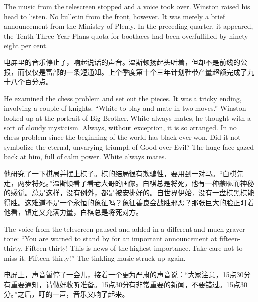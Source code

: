 \begin{paracol}{2}
\switchcolumn*

The music from the telescreen stopped and a voice took over. Winston
raised his head to listen. No bulletin from the front, however. It was
merely a brief announcement from the Ministry of Plenty. In the
preceding quarter, it appeared, the Tenth Three-Year
Plan\textquotesingle s quota for bootlaces had been overfulfilled by
ninety-eight per cent.

\switchcolumn

电屏里的音乐停止了，响起说话的声音。温斯顿扬起头听着，但却不是前线的公报，而仅仅是富部的一条短通知。上个季度第十个三年计划鞋带产量超额完成了九十八个百分点。

\switchcolumn*

He examined the chess problem and set out the pieces. It was a tricky
ending, involving a couple of knights. ``White to play and mate in two
moves.'' Winston looked up at the portrait of Big Brother. White always
mates, he thought with a sort of cloudy mysticism. Always, without
exception, it is so arranged. In no chess problem since the beginning of
the world has black ever won. Did it not symbolize the eternal,
unvarying triumph of Good over Evil? The huge face gazed back at him,
full of calm power. White always mates.

\switchcolumn

他研究了一下棋局并摆上棋子。棋的结局很有欺骗性，要用到一对马。``白棋先走，两步将死。''温斯顿看了看老大哥的画像。白棋总是将死，他有一种蒙眬而神秘的感觉。总是这样，没有例外，都是被安排好的。自世界伊始，没有一盘棋黑棋能得胜。这难道不是一个永恒的象征吗？象征善良会战胜邪恶？那张巨大的脸正盯着他看，镇定又充满力量，白棋总是将死对方。

\switchcolumn*

The voice from the telescreen paused and added in a different and much
graver tone: ``You are warned to stand by for an important announcement
at fifteen-thirty. Fifteen-thirty! This is news of the highest
importance. Take care not to miss it. Fifteen-thirty!'' The tinkling
music struck up again.

\switchcolumn

电屏上，声音暂停了一会儿，接着一个更为严肃的声音说：``大家注意，15点30分有重要通知，请做好收听准备。15点30分有非常重要的新闻，不要错过。15点30分。''之后，叮的一声，音乐又响了起来。

\switchcolumn*


\end{paracol}
